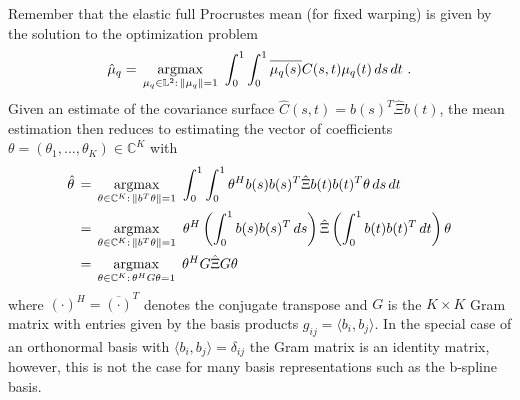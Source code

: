 Remember that the elastic full Procrustes mean (for fixed warping) is given by the solution to the optimization problem
$$ \hat\mu_q = \, \operatorname*{argmax}_{\mu_q \in \mathbb{L}^2:\,\lVert\mu_q\rVert = 1}\,\,
   \int_0^1 \int_0^1 \overline{\mu_q (s)} C(s,t) \mu_q(t) \,ds\,dt\,\,. $$
Given an estimate of the covariance surface $\hat{C}(s,t) = b(s)^T \hat\Xi b(t)$, the mean estimation then reduces to estimating the vector of coefficients $\theta = (\theta_1, \dots, \theta_K) \in \mathbb{C}^K$ with
\begin{align*}
  \hat\theta& \, = \, \operatorname*{argmax}_{\theta \in \mathbb{C}^K:\,\lVert b^T\theta\rVert = 1}\,\,
    \int_0^1 \int_0^1 \theta^H b(s) b(s)^T \hat\Xi b(t) b(t)^T \theta \,ds\,dt \\
  &\, = \, \operatorname*{argmax}_{\theta \in \mathbb{C}^K:\,\lVert b^T\theta\rVert = 1}\,\,
    \theta^H \left( \int_0^1 b(s) b(s)^T \,ds \right) \hat\Xi \left( \int_0^1 b(t) b(t)^T \,dt\right) \theta \\
  &\, = \, \operatorname*{argmax}_{\theta \in \mathbb{C}^K:\,\theta^H G \theta = 1}\,\,
    \theta^H G \hat\Xi G \theta 
\end{align*}
where $(\cdot)^H = \overline{(\cdot)}^T$ denotes the conjugate transpose and $G$ is the $K \times K$ Gram matrix with entries given by the basis products $g_{ij} = \langle b_i, b_j \rangle$.
In the special case of an orthonormal basis with $\langle b_i, b_j \rangle = \delta_{ij}$ the Gram matrix is an identity matrix, however, this is not the case for many basis representations such as the b-spline basis.

